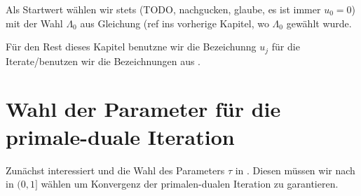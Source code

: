 Als Startwert wählen wir stets (TODO, nachgucken, glaube, es ist immer $u_0=0$)
mit der Wahl $\Lambda_0$ aus Gleichung (ref ins vorherige Kapitel, wo
$\Lambda_0$ gewählt wurde.

Für den Rest dieses Kapitel benutzne wir die Bezeichunng $u_j$ für die
Iterate/benutzen wir die Bezeichnungen aus .


\section{Wahl der Parameter für die primale-duale Iteration}
\label{sec:choiceOfParameters}

Zunächst interessiert und die Wahl des Parameters $\tau$ in 
. 
Diesen müssen wir nach  in $(0,1]$ wählen um
Konvergenz der primalen-dualen Iteration zu garantieren.

%


